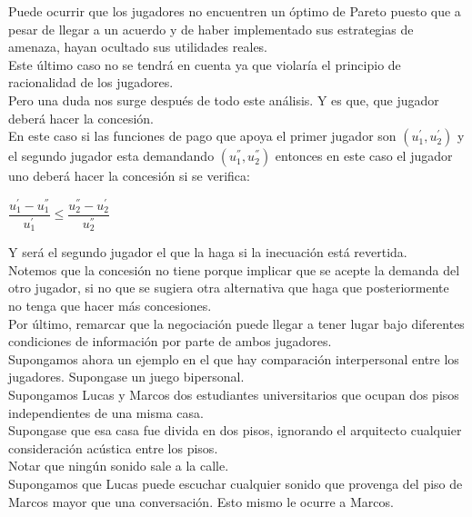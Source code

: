 \documentclass[10pt,a4paper]{book}
\begin{document}
Puede ocurrir que los jugadores no encuentren un óptimo de Pareto puesto que a pesar de llegar a un acuerdo y de haber implementado sus estrategias de amenaza, hayan ocultado sus utilidades reales.\\

Este último caso no se tendrá en cuenta ya que violaría el principio de racionalidad de los jugadores.\\

Pero una duda nos surge después de todo este análisis. Y es que, que jugador deberá hacer la concesión.\\

En este caso si las funciones de pago que apoya el primer jugador son $(u^{'}_1,u^{'}_2)$ y el segundo jugador esta demandando $(u^{''}_1,u^{''}_2)$ entonces en este caso el jugador uno deberá hacer la concesión si se verifica:\\

\begin{center}

$\dfrac{u^{'}_1-u^{''}_1}{u^{'}_1} \leq \dfrac{u^{''}_2-u^{'}_2}{u^{''}_2}$

\end{center}
Y será el segundo jugador el que la haga si la inecuación está revertida.\\

Notemos que la concesión no tiene porque implicar que se acepte la demanda del otro jugador, si no que se sugiera otra alternativa que haga que posteriormente no tenga que hacer más concesiones.\\


Por último, remarcar que la negociación puede llegar a tener lugar bajo diferentes condiciones de información por parte de ambos jugadores.\\

Supongamos ahora un ejemplo en el que hay comparación interpersonal entre los jugadores. Supongase un juego bipersonal.\\

Supongamos Lucas y Marcos dos estudiantes universitarios que ocupan dos pisos independientes de una misma casa.\\
Supongase que esa casa fue divida en dos pisos, ignorando el arquitecto cualquier consideración acústica entre los pisos.\\
Notar que ningún sonido sale a la calle.\\

Supongamos que Lucas puede escuchar cualquier sonido que provenga del piso de Marcos mayor que una conversación. Esto mismo le ocurre a Marcos.\\
\end{document}
